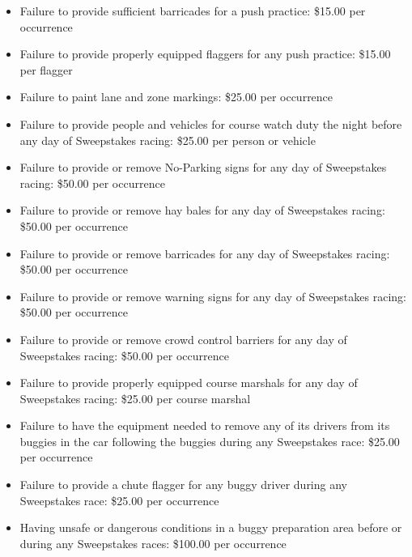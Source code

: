 \begin{itemize}
		\item Failure to provide sufficient barricades for a push practice: \$15.00
		per occurrence

		\item Failure to provide properly equipped flaggers for any push practice:
		\$15.00 per flagger

		\item Failure to paint lane and zone markings: \$25.00 per occurrence

		\item Failure to provide people and vehicles for course watch duty the
		night before any day of Sweepstakes racing: \$25.00 per person or vehicle

		\item Failure to provide or remove No-Parking signs for any day of
		Sweepstakes racing: \$50.00 per occurrence

		\item Failure to provide or remove hay bales for any day of Sweepstakes
		racing: \$50.00 per occurrence

		\item Failure to provide or remove barricades for any day of Sweepstakes
		racing: \$50.00 per occurrence

		\item Failure to provide or remove warning signs for any day of Sweepstakes
		racing: \$50.00 per occurrence

		\item Failure to provide or remove crowd control barriers for any day of
		Sweepstakes racing: \$50.00 per occurrence

		\item Failure to provide properly equipped course marshals for any day of
		Sweepstakes racing: \$25.00 per course marshal

		\item Failure to have the equipment needed to remove any of its drivers
		from its buggies in the car following the buggies during any Sweepstakes race:
		\$25.00 per occurrence

		\item Failure to provide a chute flagger for any buggy driver during any
		Sweepstakes race: \$25.00 per occurrence

		\item Having unsafe or dangerous conditions in a buggy preparation area
		before or during any Sweepstakes races: \$100.00 per occurrence

	\end{itemize}

